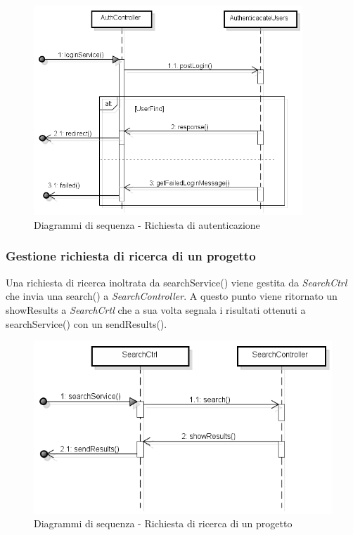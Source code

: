 	\begin{figure}[H]
		\centering
		\includegraphics[width=0.9\textwidth]{img/login.png}
		\caption{Diagrammi di sequenza - Richiesta di autenticazione}
	\end{figure}

\newpage
	\subsubsection{Gestione richiesta di ricerca di un progetto}
	Una richiesta di ricerca inoltrata da searchService() viene gestita da \textit{SearchCtrl} che invia una search() a \textit{SearchController}. A questo punto viene ritornato un showResults a \textit{SearchCrtl} che a sua volta segnala i risultati ottenuti a searchService() con un sendResults().
	\begin{figure}[H]
		\centering
		\includegraphics[scale=0.5]{img/search.png}
		\caption{Diagrammi di sequenza - Richiesta di ricerca di un progetto}
	\end{figure}
	
